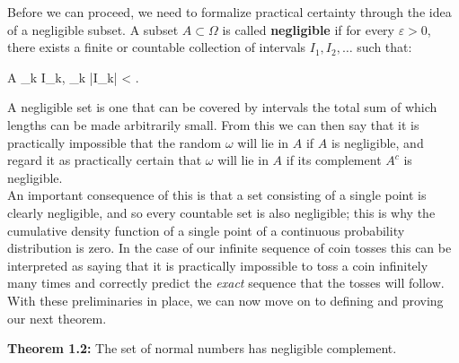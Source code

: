 Before we can proceed, we need to formalize practical certainty through the idea of a negligible subset. A subset \( A \subset \Omega \) is called \textbf{negligible} if for every \( \varepsilon > 0 \), there exists a finite or countable collection of intervals \( I_1, I_2, \ldots \) such that:
\begin{UNequation}
	A \subset \bigcup_k I_k, \quad {}  \quad  \sum_k |I_k| < \varepsilon.    
\end{UNequation}
A negligible set is one that can be covered by intervals the total sum of which lengths can be made arbitrarily small. From this we can then say that it is practically impossible that the random $\omega$ will lie in $A$ if $A$ is negligible, and regard it as practically certain that $\omega$ will lie in $A$ if its complement $A^c$ is negligible.\\[-10pt]

An important consequence of this is that a set consisting of a single point is clearly negligible, and so every countable set is also negligible; this is why the cumulative density function of a single point of a continuous probability distribution is zero. In the case of our infinite sequence of coin tosses this can be interpreted as saying that it is practically impossible to toss a coin infinitely many times and correctly predict the \textit{exact} sequence that the tosses will follow. \\[-10pt]

With these preliminaries in place, we can now move on to defining and proving our next theorem.

 \quad

\textbf{Theorem 1.2:} The set of normal numbers has negligible complement.

